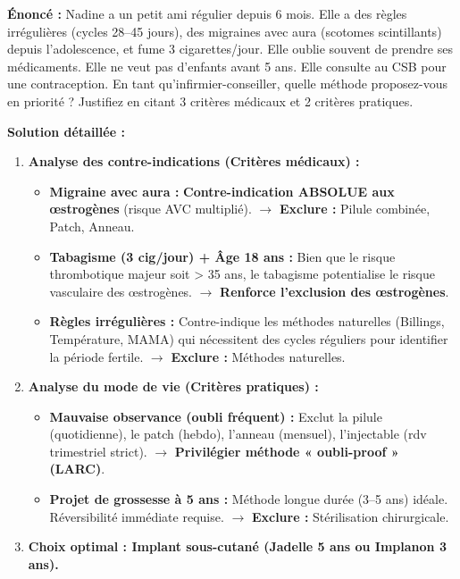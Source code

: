 \documentclass[11pt]{article}
\begin{document}
\begin{exoresolu}
\textbf{Énoncé :} Nadine a un petit ami régulier depuis 6 mois. Elle a des règles irrégulières (cycles 28--45 jours), des migraines avec aura (scotomes scintillants) depuis l'adolescence, et fume 3 cigarettes/jour. Elle oublie souvent de prendre ses médicaments. Elle ne veut pas d'enfants avant 5 ans. Elle consulte au CSB pour une contraception. En tant qu'infirmier-conseiller, quelle méthode proposez-vous en priorité ? Justifiez en citant 3 critères médicaux et 2 critères pratiques.

\textbf{Solution détaillée :}
\begin{enumerate}
    \item \textbf{Analyse des contre-indications (Critères médicaux) :}
    \begin{itemize}
        \item \textbf{Migraine avec aura :} \textbf{Contre-indication ABSOLUE aux œstrogènes} (risque AVC multiplié). $\rightarrow$ \textbf{Exclure :} Pilule combinée, Patch, Anneau.
        \item \textbf{Tabagisme (3 cig/jour) + Âge 18 ans :} Bien que le risque thrombotique majeur soit > 35 ans, le tabagisme potentialise le risque vasculaire des œstrogènes. $\rightarrow$ \textbf{Renforce l'exclusion des œstrogènes}.
        \item \textbf{Règles irrégulières :} Contre-indique les méthodes naturelles (Billings, Température, MAMA) qui nécessitent des cycles réguliers pour identifier la période fertile. $\rightarrow$ \textbf{Exclure :} Méthodes naturelles.
    \end{itemize}
    \item \textbf{Analyse du mode de vie (Critères pratiques) :}
    \begin{itemize}
        \item \textbf{Mauvaise observance (oubli fréquent) :} Exclut la pilule (quotidienne), le patch (hebdo), l'anneau (mensuel), l'injectable (rdv trimestriel strict). $\rightarrow$ \textbf{Privilégier méthode « oubli-proof » (LARC)}.
        \item \textbf{Projet de grossesse à 5 ans :} Méthode longue durée (3--5 ans) idéale. Réversibilité immédiate requise. $\rightarrow$ \textbf{Exclure :} Stérilisation chirurgicale.
    \end{itemize}
    \item \textbf{Choix optimal : \textbf{Implant sous-cutané (Jadelle 5 ans ou Implanon 3 ans)}.}

\end{enumerate}
\end{exoresolu}
\end{document}

